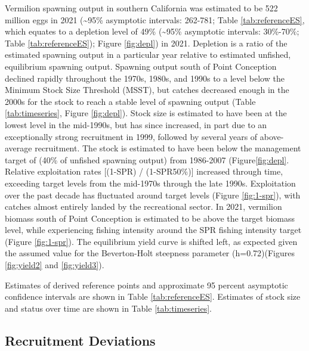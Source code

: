 \documentclass[11pt,
  english,
  a4paper,
]{article}
\begin{document}
Vermilion spawning output in southern California was estimated to be 522 million eggs in 2021 (\textasciitilde95\% asymptotic intervals: 262-781; Table \ref{tab:referenceES}, which equates to a depletion level of 49\% (\textasciitilde95\% asymptotic intervals: 30\%-70\%; Table \ref{tab:referenceES}); Figure \ref{fig:depl}) in 2021. Depletion is a ratio of the estimated spawning output in a particular year relative to estimated unfished, equilibrium spawning output. Spawning output south of Point Conception declined rapidly throughout the 1970s, 1980s, and 1990s to a level below the Minimum Stock Size Threshold (MSST), but catches decreased enough in the 2000s for the stock to reach a stable level of spawning output (Table \ref{tab:timeseries}, Figure \ref{fig:depl}). Stock size is estimated to have been at the lowest level in the mid-1990s, but has since increased, in part due to an exceptionally strong recruitment in 1999, followed by several years of above-average recruitment. The stock is estimated to have been below the management target of (40\% of unfished spawning output) from 1986-2007 (Figure\ref{fig:depl}. Relative exploitation rates {[}(1-SPR) / (1-SPR50\%){]} increased through time, exceeding target levels from the mid-1970s through the late 1990s. Exploitation over the past decade has fluctuated around target levels (Figure \ref{fig:1-spr}), with catches almost entirely landed by the recreational sector. In 2021, vermilion biomass south of Point Conception is estimated to be above the target biomass level, while experiencing fishing intensity around the SPR fishing intensity target (Figure \ref{fig:1-spr}). The equilibrium yield curve is shifted left, as expected given the assumed value for the Beverton-Holt steepness parameter (h=0.72)(Figures \ref{fig:yield2} and \ref{fig:yield3}).

Estimates of derived reference points and approximate 95 percent asymptotic confidence intervals are shown in Table \ref{tab:referenceES}. Estimates of stock size and status over time are shown in Table \ref{tab:timeseries}.


\hypertarget{recruitment-deviations}{%
\subsection{Recruitment Deviations}\label{recruitment-deviations}}

\leavevmode\tagmcend\tagstructend
\end{document}

